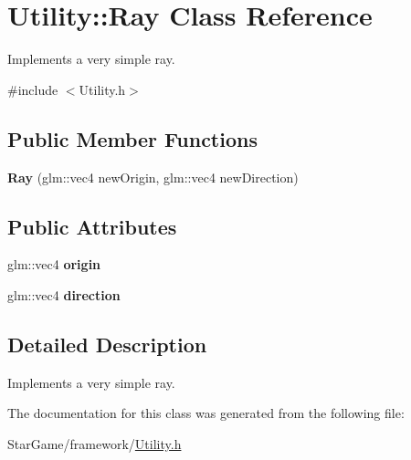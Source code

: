 \hypertarget{class_utility_1_1_ray}{\section{Utility\-:\-:Ray Class Reference}
\label{class_utility_1_1_ray}
}


Implements a very simple ray.  




{\ttfamily \#include $<$Utility.\-h$>$}

\subsection*{Public Member Functions}
\begin{DoxyCompactItemize}
\item 
\hypertarget{class_utility_1_1_ray_a7d0601241ba5bd2ecfb193949c4272b0}{{\bfseries Ray} (glm\-::vec4 new\-Origin, glm\-::vec4 new\-Direction)}\label{class_utility_1_1_ray_a7d0601241ba5bd2ecfb193949c4272b0}

\end{DoxyCompactItemize}
\subsection*{Public Attributes}
\begin{DoxyCompactItemize}
\item 
\hypertarget{class_utility_1_1_ray_a77dd3fc14959ef65957d63e27e811f98}{glm\-::vec4 {\bfseries origin}}\label{class_utility_1_1_ray_a77dd3fc14959ef65957d63e27e811f98}

\item 
\hypertarget{class_utility_1_1_ray_adcb8f8503dd1960fd775a00764476e32}{glm\-::vec4 {\bfseries direction}}\label{class_utility_1_1_ray_adcb8f8503dd1960fd775a00764476e32}

\end{DoxyCompactItemize}


\subsection{Detailed Description}
Implements a very simple ray. 

The documentation for this class was generated from the following file\-:\begin{DoxyCompactItemize}
\item 
Star\-Game/framework/\hyperlink{_utility_8h}{Utility.\-h}\end{DoxyCompactItemize}
